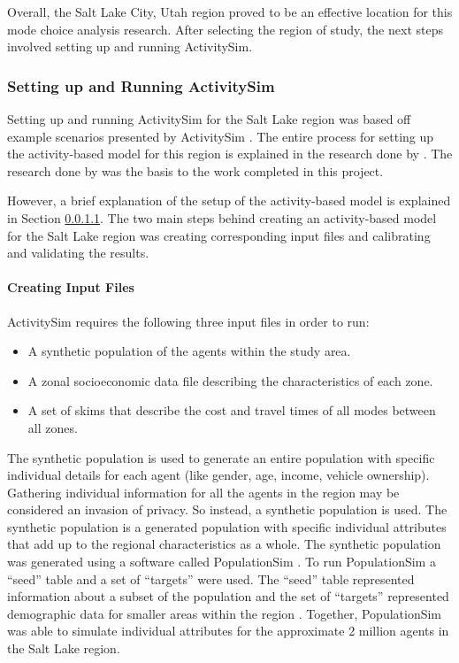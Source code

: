 \documentclass[3p, authoryear, review]{elsarticle} %
\providecommand{\tightlist}{%
  \setlength{\itemsep}{0pt}\setlength{\parskip}{0pt}}
\begin{document}
Overall, the Salt Lake City, Utah region proved to be an effective location for this mode choice analysis research. After selecting the region of study, the next steps involved setting up and running ActivitySim.

\hypertarget{setting-up-and-running-activitysim}{%
\subsubsection{Setting up and Running ActivitySim}\label{setting-up-and-running-activitysim}}

Setting up and running ActivitySim for the Salt Lake region was based off example scenarios presented by ActivitySim \citep{asim}. The entire process for setting up the activity-based model for this region is explained in the research done by \citet{nate}. The research done by \citet{nate} was the basis to the work completed in this project.

However, a brief explanation of the setup of the activity-based model is explained in Section \ref{asiminput}. The two main steps behind creating an activity-based model for the Salt Lake region was creating corresponding input files and calibrating and validating the results.

\hypertarget{asiminput}{%
\paragraph{Creating Input Files}\label{asiminput}}

ActivitySim requires the following three input files in order to run:

\begin{itemize}
\tightlist
\item
  A synthetic population of the agents within the study area.
\item
  A zonal socioeconomic data file describing the characteristics of each zone.
\item
  A set of skims that describe the cost and travel times of all modes between all zones.
\end{itemize}

The synthetic population is used to generate an entire population with specific individual details for each agent (like gender, age, income, vehicle ownership). Gathering individual information for all the agents in the region may be considered an invasion of privacy. So instead, a synthetic population is used. The synthetic population is a generated population with specific individual attributes that add up to the regional characteristics as a whole. The synthetic population was generated using a software called PopulationSim \citep{popsim}. To run PopulationSim a ``seed'' table and a set of ``targets'' were used. The ``seed'' table represented information about a subset of the population and the set of ``targets'' represented demographic data for smaller areas within the region \citep{nate}. Together, PopulationSim was able to simulate individual attributes for the approximate 2 million agents in the Salt Lake region.
\end{document}
